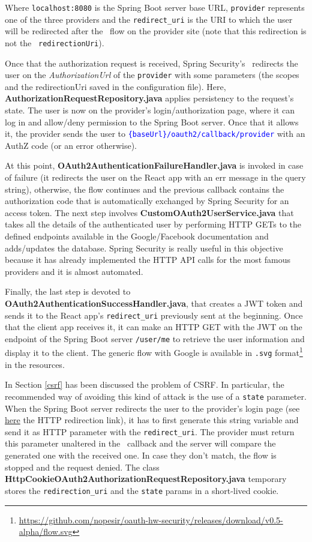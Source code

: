 \noindent Where \texttt{localhost:8080} is the Spring Boot server base URL, \texttt{provider} represents one of the three providers and the \texttt{redirect\_uri} is the URI to which the user will be redirected after the \oauth\ flow on the provider site (note that this redirection is not the \oauth\ \texttt{redirectionUri}).

Once that the authorization request is received, Spring Security's \oauth\ redirects the user on the \textit{AuthorizationUrl} of the \texttt{provider} with some parameters (the scopes and the redirectionUri saved in the configuration file). Here, \textbf{AuthorizationRequestRepository.java} applies persistency to the request's state. The user is now on the provider's login/authorization page, where it can log in and allow/deny permission to the Spring Boot server. Once that it allows it, the provider sends the user to \textcolor{blue}{\texttt{\{baseUrl\}/oauth2/callback/provider}} with an AuthZ code (or an error otherwise).

At this point, \textbf{OAuth2AuthenticationFailureHandler.java} is invoked in case of failure (it redirects the user on the React app with an err message in the query string), otherwise, the flow continues and the previous callback contains the authorization code that is automatically exchanged by Spring Security for an access token. The next step involves \textbf{CustomOAuth2UserService.java} that takes all the details of the authenticated user by performing HTTP GETs to the defined endpoints available in the Google/Facebook documentation and adds/updates the database. Spring Security is really useful in this objective because it has already implemented the HTTP API calls for the most famous providers and it is almost automated. 

Finally, the last step is devoted to \textbf{OAuth2AuthenticationSuccessHandler.java}, that creates a JWT token and sends it to the React app's \texttt{redirect\_uri} previously sent at the beginning. Once that the client app receives it, it can make an HTTP GET with the JWT on the endpoint of the Spring Boot server \texttt{/user/me} to retrieve the user information and display it to the client. The generic flow with Google is available in \texttt{.svg} format\footnote{\url{https://github.com/nopesir/oauth-hw-security/releases/download/v0.5-alpha/flow.svg}} in the resources.


In Section \ref{csrf} has been discussed the problem of CSRF. In particular, the recommended way of avoiding this kind of attack is the use of a \texttt{state} parameter. When the Spring Boot server redirects the user to the provider's login page (see \hyperlink{foo}{here} the HTTP redirection link), it has to first generate this string variable and send it as HTTP parameter with the \texttt{redirect\_uri}. The provider must return this parameter unaltered in the \oauth\ callback and the server will compare the generated one with the received one. In case they don't match, the flow is stopped and the request denied.
The class \textbf{HttpCookieOAuth2AuthorizationRequestRepository.java} temporary stores the \texttt{redirection\_uri} and the \texttt{state} params in a short-lived cookie.


